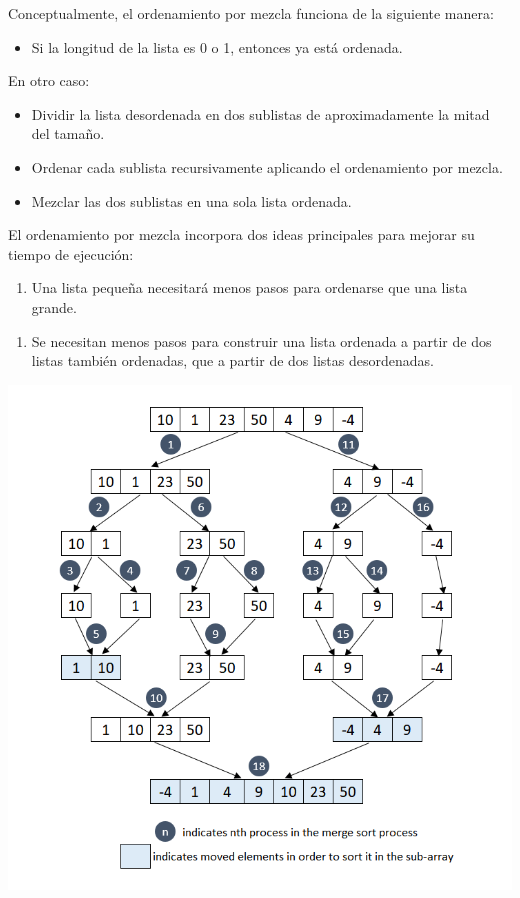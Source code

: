 \documentclass{article}
\begin{document}
\begin{enumerate}
        Conceptualmente, el ordenamiento por mezcla funciona de la siguiente manera: 
        \begin{itemize}
            \item Si la longitud de la lista es 0 o 1, entonces ya está ordenada.
        \end{itemize}
    
        En otro caso: 
        \begin{itemize}
            \item Dividir la lista desordenada en dos sublistas de aproximadamente la mitad del tamaño. 
            \item Ordenar cada sublista recursivamente aplicando el ordenamiento por mezcla. 
            \item Mezclar las dos sublistas en una sola lista ordenada.
        \end{itemize}

        El ordenamiento por mezcla incorpora dos ideas principales para mejorar su tiempo de ejecución:
        \begin{enumerate}
            \item Una lista pequeña necesitará menos pasos para ordenarse que una lista grande.
        \end{enumerate}
        \begin{enumerate}
            \item Se necesitan menos pasos para construir una lista ordenada a partir de dos listas también ordenadas, que a partir de dos listas desordenadas.
        \end{enumerate}
    
        
    \includegraphics[width=\textwidth]{img/merge-sort}
        

\end{enumerate}
\end{document}
